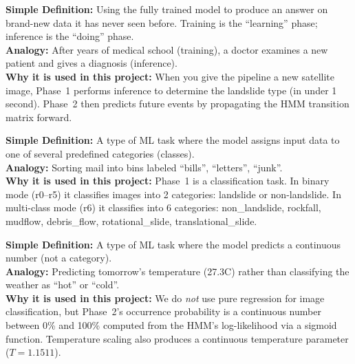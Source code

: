 \documentclass[11pt]{article}
\begin{document}
\begin{description}[style=nextline, leftmargin=1.5cm]

    \item[\textbf{Inference / Prediction}]
    \textbf{Simple Definition:} Using the fully trained model to produce an answer on brand-new data it has never seen before. Training is the ``learning'' phase; inference is the ``doing'' phase.\\
    \textbf{Analogy:} After years of medical school (training), a doctor examines a new patient and gives a diagnosis (inference).\\
    \textbf{Why it is used in this project:} When you give the pipeline a new satellite image, Phase~1 performs inference to determine the landslide type (in under 1 second). Phase~2 then predicts future events by propagating the HMM transition matrix forward.

    \item[\textbf{Classification}]
    \textbf{Simple Definition:} A type of ML task where the model assigns input data to one of several predefined categories (classes).\\
    \textbf{Analogy:} Sorting mail into bins labeled ``bills'', ``letters'', ``junk''.\\
    \textbf{Why it is used in this project:} Phase~1 is a classification task. In binary mode (r0--r5) it classifies images into 2 categories: landslide or non-landslide. In multi-class mode (r6) it classifies into 6 categories: non\_landslide, rockfall, mudflow, debris\_flow, rotational\_slide, translational\_slide.

    \item[\textbf{Regression}]
    \textbf{Simple Definition:} A type of ML task where the model predicts a continuous number (not a category).\\
    \textbf{Analogy:} Predicting tomorrow's temperature (27.3\textdegree C) rather than classifying the weather as ``hot'' or ``cold''.\\
    \textbf{Why it is used in this project:} We do \emph{not} use pure regression for image classification, but Phase~2's occurrence probability is a continuous number between 0\% and 100\% computed from the HMM's log-likelihood via a sigmoid function. Temperature scaling also produces a continuous temperature parameter ($T = 1.1511$).


\end{description}
\end{document}
